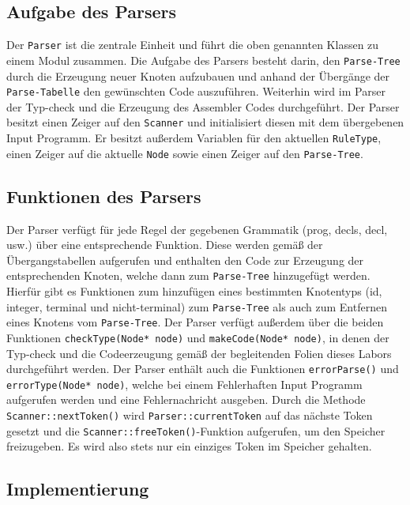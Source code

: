 \documentclass[
a4paper,   %
11pt,      %
oneside,   %
onecolumn, %
final      %
]{article}
\newcommand{\code}[1]{\lstinline$#1$}
\begin{document}
\subsection{Aufgabe des Parsers}
Der \code{Parser} ist die zentrale Einheit und führt die oben genannten Klassen zu einem Modul zusammen. Die Aufgabe des Parsers besteht darin, den \code{Parse-Tree} durch die Erzeugung neuer Knoten aufzubauen und anhand der Übergänge der \code{Parse-Tabelle} den gewünschten Code auszuführen. Weiterhin wird im Parser der Typ-check und die Erzeugung des Assembler Codes durchgeführt. Der Parser besitzt einen Zeiger auf den \code{Scanner} und initialisiert diesen mit dem übergebenen Input Programm. Er besitzt außerdem Variablen für den aktuellen \code{RuleType}, einen Zeiger auf die aktuelle \code{Node} sowie einen Zeiger auf den \code{Parse-Tree}.

\subsection{Funktionen des Parsers}
Der Parser verfügt für jede Regel der gegebenen Grammatik (prog, decls, decl, usw.) über eine entsprechende Funktion. Diese werden gemäß der Übergangstabellen aufgerufen und enthalten den Code zur Erzeugung der entsprechenden Knoten, welche dann zum \code{Parse-Tree} hinzugefügt werden. Hierfür gibt es Funktionen zum hinzufügen eines bestimmten Knotentyps (id, integer, terminal und nicht-terminal) zum \code{Parse-Tree} als auch zum Entfernen eines Knotens vom \code{Parse-Tree}. Der Parser verfügt außerdem über die beiden Funktionen \code{checkType(Node* node)} und \code{makeCode(Node* node)}, in denen der Typ-check und die Codeerzeugung gemäß der begleitenden Folien dieses Labors durchgeführt werden. Der Parser enthält auch die Funktionen \code{errorParse()} und \code{errorType(Node* node)}, welche bei einem Fehlerhaften Input Programm aufgerufen werden und eine Fehlernachricht ausgeben. Durch die Methode \code{Scanner::nextToken()} wird \code{Parser::currentToken} auf das nächste Token gesetzt und die \code{Scanner::freeToken()}-Funktion aufgerufen, um den Speicher freizugeben. Es wird also stets nur ein einziges Token im Speicher gehalten.

\subsection{Implementierung}
\end{document}

